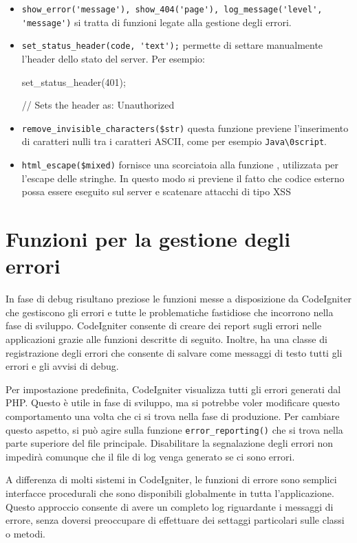 \begin{itemize}
\item \verb|show_error('message'), show_404('page'), log_message('level', 'message')| si tratta di funzioni legate alla gestione degli errori.

\item \verb|set_status_header(code, 'text');| permette di settare manualmente l'header dello stato del server. Per esempio:

\begin{code}
set_status_header(401);

// Sets the header as: Unauthorized
\end{code}

\item \verb|remove_invisible_characters($str)| questa funzione previene l'inserimento di caratteri nulli tra i caratteri ASCII, come per esempio \verb|Java\0script|.

\item \verb|html_escape($mixed)| fornisce una scorciatoia alla funzione , utilizzata per l'escape delle stringhe. In questo modo si previene il fatto che codice esterno possa essere eseguito sul server e scatenare attacchi di tipo \ac{XSS}
\end{itemize}

\section*{Funzioni per la gestione degli errori}
In fase di debug risultano preziose le funzioni messe a disposizione da CodeIgniter che gestiscono gli errori e tutte le problematiche fastidiose che incorrono nella fase di sviluppo. CodeIgniter consente di creare dei report sugli errori nelle applicazioni grazie alle funzioni descritte di seguito. Inoltre, ha una classe di registrazione degli errori che consente di salvare come messaggi di testo tutti gli errori e gli avvisi di debug.

Per impostazione predefinita, CodeIgniter visualizza tutti gli errori generati dal PHP. Questo è utile in fase di sviluppo, ma si potrebbe voler modificare questo comportamento una volta che ci si trova nella fase di produzione. Per cambiare questo aspetto, si può agire sulla funzione \verb|error_reporting()| che si trova nella parte superiore del file  principale. Disabilitare la segnalazione degli errori non impedirà comunque che il file di log venga generato se ci sono errori. 

A differenza di molti sistemi in CodeIgniter, le funzioni di errore sono semplici interfacce procedurali che sono disponibili globalmente in tutta l'applicazione. Questo approccio consente di avere un completo log riguardante i messaggi di errore, senza doversi preoccupare di effettuare dei settaggi particolari sulle classi o metodi.

